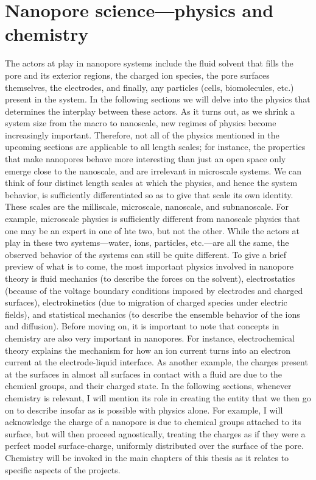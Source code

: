 	\section{Nanopore science---physics and chemistry}

		The actors at play in nanopore systems include the fluid solvent that fills the pore and its exterior regions, the charged ion species, the pore surfaces themselves, the electrodes, and finally, any particles (cells, biomolecules, etc.) present in the system. In the following sections we will delve into the physics that determines the interplay between these actors. As it turns out, as we shrink a system size from the macro to nanoscale, new regimes of physics become increasingly important. Therefore, not all of the physics mentioned in the upcoming sections are applicable to all length scales; for instance, the properties that make nanopores behave more interesting than just an open space only emerge close to the nanoscale, and are irrelevant in microscale systems. We can think of four distinct length scales at which the physics, and hence the system behavior, is sufficiently differentiated so as to give that scale its own identity. These scales are the milliscale, microscale, nanoscale, and subnanoscale. For example, microscale physics is sufficiently different from nanoscale physics that one may be an expert in one of hte two, but not the other. While the actors at play in these two systems---water, ions, particles, etc.---are all the same, the observed behavior of the systems can still be quite different. To give a brief preview of what is to come, the most important physics involved in nanopore theory is fluid mechanics (to describe the forces on the solvent), electrostatics (because of the voltage boundary conditions imposed by electrodes and charged surfaces), electrokinetics (due to migration of charged species under electric fields), and statistical mechanics (to describe the ensemble behavior of the ions and diffusion). Before moving on, it is important to note that concepts in chemistry are also very important in nanopores. For instance, electrochemical theory explains the mechanism for how an ion current turns into an electron current at the electrode-liquid interface. As another example, the charges present at the surfaces in almost all surfaces in contact with a fluid are due to the chemical groups, and their charged state. In the following sections, whenever chemistry is relevant, I will mention its role in creating the entity that we then go on to describe insofar as is possible with physics alone. For example, I will acknowledge the charge of a nanopore is due to chemical groups attached to its surface, but will then proceed agnostically, treating the charges as if they were a perfect model surface-charge, uniformly distributed over the surface of the pore. Chemistry will be invoked in the main chapters of this thesis as it relates to specific aspects of the projects.

